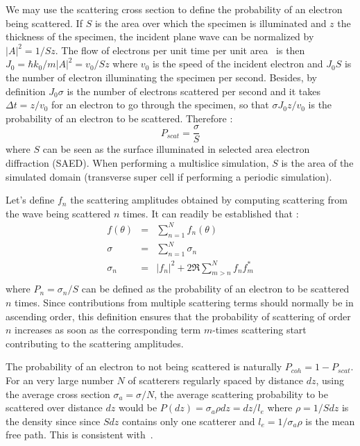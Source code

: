 We may use the scattering cross section to define the probability of an electron
being scattered. If $S$ is the area over which the specimen is illuminated and
$z$ the thickness of the specimen, the incident plane wave can be normalized by
$|A|^2=1/Sz$. The flow of electrons per unit time per unit area~\cite{Vainshtein1964}
is then $J_0=\hbar k_0/m |A|^2=v_0/Sz$ where $v_0$ is the speed of the incident
electron and $J_0 S$ is the number of electron illuminating the specimen per second.
Besides, by definition $J_0\sigma$ is the number of electrons scattered per second
and it takes $\Delta t=z/v_0$ for an electron to go through the specimen,
so that $\sigma J_0z/v_0$ is the probability of an electron to be scattered.
Therefore :
%
\begin{equation*}
  P_{scat}=\frac{\sigma}{S}
\end{equation*}
%
where $S$ can be seen as the surface illuminated in selected area electron
diffraction (SAED). When performing a multislice simulation, $S$ is the area of
the simulated domain (transverse super cell if performing a periodic simulation).

Let's define $f_n$ the scattering amplitudes obtained by computing scattering
from the wave being scattered $n$ times. It can readily be established that :
%
\begin{eqnarray}
    f(\theta) &=& \sum_{n=1}^N f_n(\theta)  \nonumber\\
    \sigma    &=& \sum_{n=1}^N \sigma_n     \nonumber\\
    \sigma_n  &=& \lvert f_n\rvert^{2} + 2\Re\sum_{m>n}^N f_nf_m^{*}\label{eq:sigma_n}\\\nonumber
\end{eqnarray}
%
where $P_n=\sigma_n/S$ can be defined as the probability of an electron to be
scattered $n$ times. Since contributions from multiple scattering terms should
normally be in ascending order, this definition ensures that the probability of
scattering of order $n$ increases as soon as the corresponding term $m$-times
scattering start contributing to the scattering amplitudes.

The probability of an electron to not being scattered is naturally $P_{coh}=1-P_{scat}$.
For an very large number $N$ of scatterers regularly spaced by distance
$dz$, using the average cross section $\sigma_a=\sigma/N$, the average scattering
probability to be scattered over distance $dz$ would be
$P(dz)=\sigma_a\rho dz=dz/l_e$ where $\rho=1/Sdz$ is the density since since $Sdz$
contains only one scatterer and $l_e=1/\sigma_a\rho$ is the mean free path.
This is consistent with~\cite{Latychevskaia2019}.



